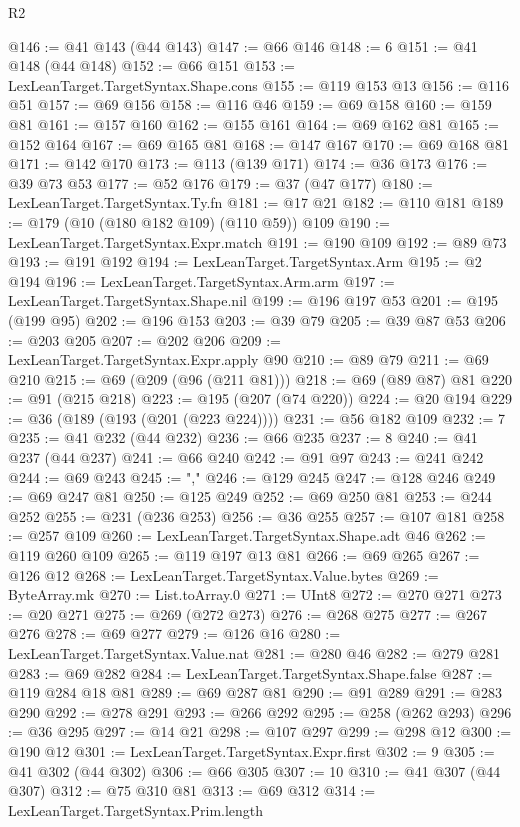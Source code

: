 \begin{lexlean}{R2}
\begin{coremodule}
@146 := @41 @143 (@44 @143)
@147 := @66 @146
@148 := 6
@151 := @41 @148 (@44 @148)
@152 := @66 @151
@153 := LexLeanTarget.TargetSyntax.Shape.cons
@155 := @119 @153 @13
@156 := @116 @51
@157 := @69 @156
@158 := @116 @46
@159 := @69 @158
@160 := @159 @81
@161 := @157 @160
@162 := @155 @161
@164 := @69 @162 @81
@165 := @152 @164
@167 := @69 @165 @81
@168 := @147 @167
@170 := @69 @168 @81
@171 := @142 @170
@173 := @113 (@139 @171)
@174 := @36 @173
@176 := @39 @73 @53
@177 := @52 @176
@179 := @37 (@47 @177)
@180 := LexLeanTarget.TargetSyntax.Ty.fn
@181 := @17 @21
@182 := @110 @181
@189 := @179 (@10 (@180 @182 @109) (@110 @59)) @109
@190 := LexLeanTarget.TargetSyntax.Expr.match
@191 := @190 @109
@192 := @89 @73
@193 := @191 @192
@194 := LexLeanTarget.TargetSyntax.Arm
@195 := @2 @194
@196 := LexLeanTarget.TargetSyntax.Arm.arm
@197 := LexLeanTarget.TargetSyntax.Shape.nil
@199 := @196 @197 @53
@201 := @195 (@199 @95)
@202 := @196 @153
@203 := @39 @79
@205 := @39 @87 @53
@206 := @203 @205
@207 := @202 @206
@209 := LexLeanTarget.TargetSyntax.Expr.apply @90
@210 := @89 @79
@211 := @69 @210
@215 := @69 (@209 (@96 (@211 @81)))
@218 := @69 (@89 @87) @81
@220 := @91 (@215 @218)
@223 := @195 (@207 (@74 @220))
@224 := @20 @194
@229 := @36 (@189 (@193 (@201 (@223 @224))))
@231 := @56 @182 @109
@232 := 7
@235 := @41 @232 (@44 @232)
@236 := @66 @235
@237 := 8
@240 := @41 @237 (@44 @237)
@241 := @66 @240
@242 := @91 @97
@243 := @241 @242
@244 := @69 @243
@245 := ","
@246 := @129 @245
@247 := @128 @246
@249 := @69 @247 @81
@250 := @125 @249
@252 := @69 @250 @81
@253 := @244 @252
@255 := @231 (@236 @253)
@256 := @36 @255
@257 := @107 @181
@258 := @257 @109
@260 := LexLeanTarget.TargetSyntax.Shape.adt @46
@262 := @119 @260 @109
@265 := @119 @197 @13 @81
@266 := @69 @265
@267 := @126 @12
@268 := LexLeanTarget.TargetSyntax.Value.bytes
@269 := ByteArray.mk
@270 := List.toArray.{0}
@271 := UInt8
@272 := @270 @271
@273 := @20 @271
@275 := @269 (@272 @273)
@276 := @268 @275
@277 := @267 @276
@278 := @69 @277
@279 := @126 @16
@280 := LexLeanTarget.TargetSyntax.Value.nat
@281 := @280 @46
@282 := @279 @281
@283 := @69 @282
@284 := LexLeanTarget.TargetSyntax.Shape.false
@287 := @119 @284 @18 @81
@289 := @69 @287 @81
@290 := @91 @289
@291 := @283 @290
@292 := @278 @291
@293 := @266 @292
@295 := @258 (@262 @293)
@296 := @36 @295
@297 := @14 @21
@298 := @107 @297
@299 := @298 @12
@300 := @190 @12
@301 := LexLeanTarget.TargetSyntax.Expr.first
@302 := 9
@305 := @41 @302 (@44 @302)
@306 := @66 @305
@307 := 10
@310 := @41 @307 (@44 @307)
@312 := @75 @310 @81
@313 := @69 @312
@314 := LexLeanTarget.TargetSyntax.Prim.length

\end{coremodule}
\end{lexlean}
